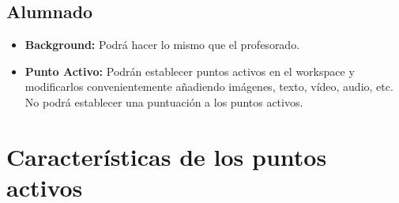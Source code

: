 \documentclass[12pt,letterpaper]{article}
\begin{document}
\subsection{Alumnado}
\begin{itemize}
	\item \textbf{Background:} Podrá hacer lo mismo que el profesorado.
	\item \textbf{Punto Activo:} Podrán establecer puntos activos en el workspace y modificarlos convenientemente añadiendo imágenes, texto, vídeo, audio, etc. No podrá establecer una puntuación a los puntos activos.
\end{itemize}


\section{Características de los puntos activos}
\end{document}
